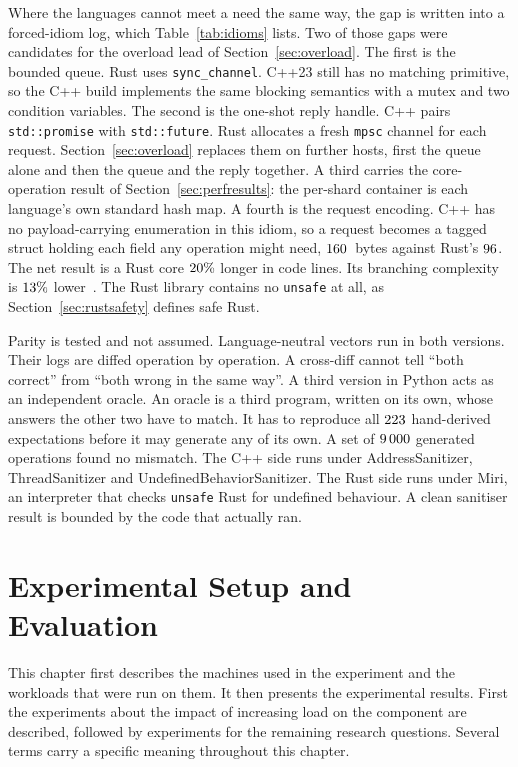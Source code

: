\documentclass[english,oneside,a4paper,censored,csm,software-track-2020]{HYthesisML}
\begin{document}
Where the languages cannot meet a need the same way, the gap is written into a
forced-idiom log, which Table~\ref{tab:idioms} lists. Two of those gaps were candidates for the
overload lead of Section~\ref{sec:overload}. The first is the bounded queue.
Rust uses \texttt{sync\_channel}. C++23 still has no matching primitive, so the
C++ build implements the same blocking semantics with a mutex and two condition
variables. The second is the one-shot reply handle. C++ pairs
\texttt{std::promise} with \texttt{std::future}. Rust allocates a fresh
\texttt{mpsc} channel for each request. Section~\ref{sec:overload} replaces
them on further hosts, first the queue alone and then the queue and the reply
together. A third carries the core-operation result of Section~\ref{sec:perfresults}: the
per-shard container is each language's own standard hash map. A fourth is the
request encoding. C++ has no payload-carrying enumeration in this idiom, so a
request becomes a tagged struct holding each field any operation might need,
$160$~bytes against Rust's $96$. The net result is
a Rust core $20\%$ longer in code lines. Its branching complexity is
$13\%$ lower~\cite{lizard}. The Rust library contains no
\texttt{unsafe} at all, as Section~\ref{sec:rustsafety} defines safe Rust.

Parity is tested and not assumed. Language-neutral vectors run in both
versions. Their logs are diffed operation by operation. A cross-diff cannot tell ``both
correct'' from ``both wrong in the same way''. A third version in Python acts
as an independent oracle. An
oracle is a third program, written on its own, whose answers the other two have to match.
It has to reproduce all $223$ hand-derived
expectations before it may generate any of its own. A set of
$9\,000$ generated operations found no mismatch. The C++ side runs under
AddressSanitizer, ThreadSanitizer and UndefinedBehaviorSanitizer. The Rust
side runs under Miri, an interpreter that checks \texttt{unsafe} Rust for
undefined behaviour. A clean sanitiser result is bounded by the code that
actually ran.

\chapter{Experimental Setup and Evaluation\label{chapter:eval}}

This chapter first describes the machines used in the experiment and 
the workloads that were run on them. It then presents the experimental results. 
First the experiments about the impact of increasing load on the component are 
described, followed by experiments for the remaining research questions.
Several terms carry a specific meaning throughout this chapter.
\end{document}
